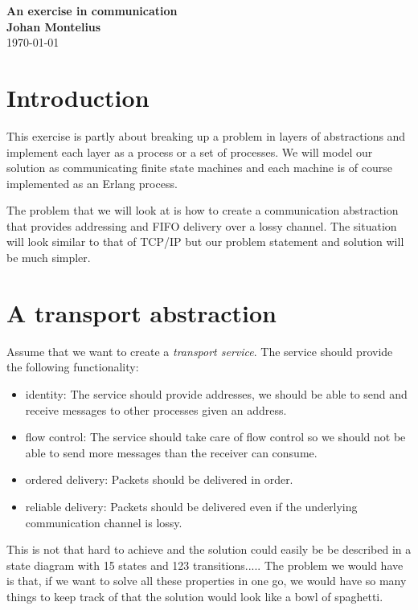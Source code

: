 \documentclass[a4paper,11pt]{article}
\newcommand{\nnsection}[1]{
\section*{#1}
\addcontentsline{toc}{section}{#1}
}
\begin{document}
\begin{center}
\vspace{20pt}
\textbf{\large An exercise in communication}\\
\vspace{10pt}
\textbf{Johan Montelius}\\
\vspace{10pt}
\today{}
\end{center}

\nnsection{Introduction}

This exercise is partly about breaking up a problem in layers of
abstractions and implement each layer as a process or a set of
processes. We will model our solution as communicating finite state
machines and each machine is of course implemented as an Erlang
process.

The problem that we will look at is how to create a communication
abstraction that provides addressing and FIFO delivery over a lossy
channel. The situation will look similar to that of TCP/IP but our
problem statement and solution will be much simpler.

\section{A transport abstraction}

Assume that we want to create a {\em transport service}. The service
should provide the following functionality:

\begin{itemize}

\item identity: The service should provide addresses, we should
  be able to send and receive messages to other processes given an
  address.

\item flow control: The service should take care of flow control so
  we should not be able to send more messages than the receiver can
  consume.

\item ordered delivery: Packets should be delivered in order.

\item reliable delivery: Packets should be delivered even if the
  underlying communication channel is lossy.

\end{itemize}

This is not that hard to achieve and the solution could easily be be
described in a state diagram with 15 states and 123
transitions..... The problem we would have is that, if we want to solve
all these properties in one go, we would have so many things to keep
track of that the solution would look like a bowl of spaghetti.
\end{document}
